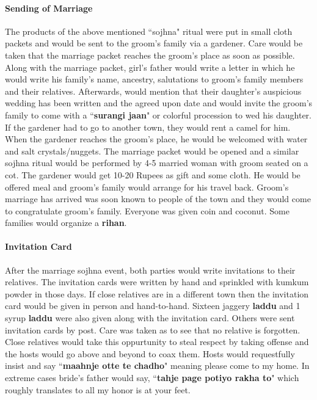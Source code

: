 \paragraph{Sending of Marriage} The products of the above mentioned ``sojhna"
ritual were put in small cloth packets and would be sent to the groom's family
via a gardener. Care would be taken that the marriage packet reaches the
groom's place as soon as possible. Along with the marriage packet, girl's
father would write a letter in which he would write his family's name,
ancestry, salutations to groom's family members and their relatives.
Afterwards, would mention that their daughter's auspicious wedding has been
written and the agreed upon date and would invite the groom's family to come
with a ``\textbf{surangi jaan}" or colorful procession to wed his daughter. If
the gardener had to go to another town, they would rent a camel for him. When
the gardener reaches the groom's place, he would be welcomed with water and
salt crystals/nuggets. The marriage packet would be opened and a similar sojhna
ritual would be performed by 4-5 married woman with groom seated on a cot. The
gardener would get 10-20 Rupees as gift and some cloth. He would be offered
meal and groom's family would arrange for his travel back. Groom's marriage has
arrived was soon known to people of the town and they would come to
congratulate groom's family. Everyone was given coin and coconut. Some families
would organize a \textbf{rihan}.

\paragraph{Invitation Card} After the marriage sojhna event, both parties would
write invitations to their relatives. The invitation cards were written by hand
and sprinkled with kumkum powder in those days. If close relatives are in a
different town then the invitation card would be given in person and
hand-to-hand. Sixteen jaggery \textbf{laddu} and 1 syrup \textbf{laddu} were
also given along with the invitation card. Others were sent invitation cards by
post. Care was taken as to see that no relative is forgotten. Close relatives
would take this oppurtunity to steal respect by taking offense and the hosts
would go above and beyond to coax them. Hosts would requestfully insist and say
``\textbf{maahnje otte te chadho}" meaning please come to my home. In extreme
cases bride's father would say, ``\textbf{tahje page potiyo rakha to}" which
roughly translates to all my honor is at your feet.

